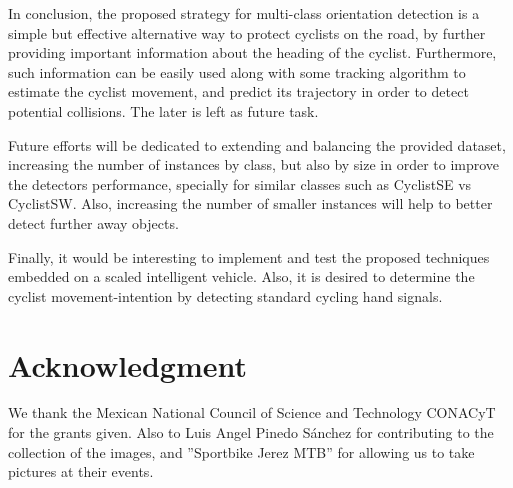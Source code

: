 \documentclass[journal]{IEEEtran}
\begin{document}
In conclusion, the proposed strategy for multi-class orientation detection is a simple but effective alternative way to protect cyclists on the road, by further providing important information about the heading of the cyclist. Furthermore, such information can be easily used along with some tracking algorithm to estimate the cyclist movement, and  predict its trajectory in order to detect potential collisions. The later is left as future task.

Future efforts will be dedicated to extending and balancing the provided dataset, increasing the number of instances by class, but also by size in order to improve the detectors performance, specially for similar classes such as CyclistSE vs CyclistSW. Also,  increasing the number of smaller instances will help  to better detect further away objects.

Finally, it would be interesting to implement and test the proposed techniques embedded on a scaled intelligent vehicle. Also, it is desired to determine the cyclist movement-intention by detecting standard cycling hand signals.

\section*{Acknowledgment}
We thank the Mexican National Council of Science and Technology CONACyT for the grants given. Also to Luis Angel Pinedo Sánchez for contributing to the collection of the images, and ”Sportbike Jerez MTB” for allowing us to take pictures at their events.




\end{document}
